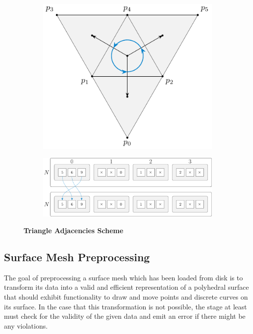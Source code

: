 \documentclass{stdlocal}
\begin{document}
  \begin{figure}[h]
    \centering
    \begin{subfigure}[c]{0.31\linewidth}
      \centering
      \includegraphics[width=\linewidth]{figures/polyhedral-surface-triangle-adjacencies-rot.pdf}
    \end{subfigure}
    \hfill
    \begin{subfigure}[c]{0.67\linewidth}
      \centering
      \includegraphics[width=\linewidth]{figures/polyhedral-surface-triangle-adjacencies-rot-struct.pdf}
    \end{subfigure}
    \caption[Triangle Adjacencies Scheme]{
      \textbf{Triangle Adjacencies Scheme}\\
    }
  \end{figure}

\subsection{Surface Mesh Preprocessing} %
\label{sub:mesh_preprocessing}
  The goal of preprocessing a surface mesh which has been loaded from disk is to transform its data into a valid and efficient representation of a polyhedral surface that should exhibit functionality to draw and move points and discrete curves on its surface.
  In the case that this transformation is not possible, the stage at least must check for the validity of the given data and emit an error if there might be any violations.
\end{document}

